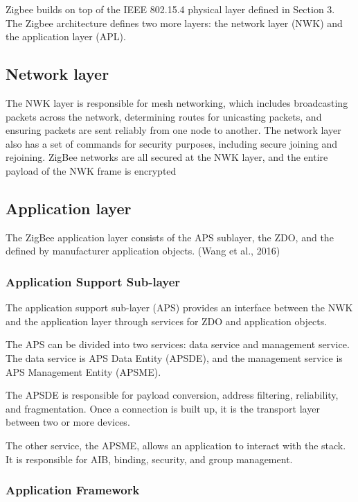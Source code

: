 Zigbee builds on top of the IEEE 802.15.4 physical layer defined in Section 3. The Zigbee architecture defines two more layers: the network layer (NWK) and the application layer (APL).

\subsection{Network layer}

The NWK layer is responsible for mesh networking, which includes broadcasting packets across the network, determining routes for unicasting packets, and ensuring packets are sent reliably from one node to another. The network layer also has a set of commands for security purposes, including secure joining and rejoining. ZigBee networks are all secured at the NWK layer, and the entire payload of the NWK frame is encrypted

\subsection{Application layer}

The ZigBee application layer consists of the APS sublayer, the ZDO, and the deﬁned by manufacturer application objects. (Wang et al., 2016)
\cite{nxp:2016}

\subsubsection{Application Support Sub-layer}

The application support sub-layer (APS) provides an interface between the NWK and the application layer through services for ZDO and application objects. 

The APS can be divided into two services: data service and management service. The data service is APS Data Entity (APSDE), and the management service is APS Management Entity (APSME).

The APSDE is responsible for payload conversion, address filtering, reliability, and fragmentation. Once a connection is built up, it is the transport layer between two or more devices.

The other service, the APSME, allows an application to interact with the stack. It is responsible for AIB, binding, security, and group management.


\subsubsection{Application Framework}

